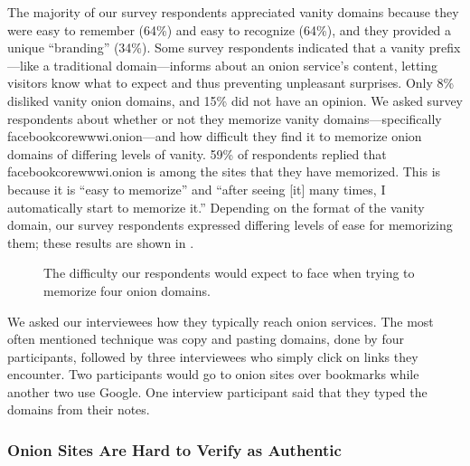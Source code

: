 The majority of our survey respondents appreciated vanity domains because they
were easy to remember (64\%) and easy to recognize (64\%), and they provided a
unique ``branding'' (34\%).  Some survey respondents indicated that a vanity
prefix---like a traditional domain---informs about an onion service's content,
letting visitors know what to expect and thus preventing unpleasant surprises.
Only 8\% disliked vanity onion domains, and 15\% did not have an opinion.  We
asked survey respondents about whether or not they memorize vanity
domains---specifically facebookcorewwwi.onion---and how difficult they find it
to memorize onion domains of differing levels of vanity.  59\% of respondents
replied that facebookcorewwwi.onion is among the sites that they have memorized.
This is 
because it is ``easy to memorize'' and ``after seeing [it] many times, I
automatically start to memorize it.'' Depending on the format of the vanity
domain, our survey respondents expressed differing levels of ease for memorizing
them; these results are shown in .

\begin{figure}[t]
    \centering
    
    \caption{The difficulty our respondents would expect to face when trying to
    memorize four onion domains.}
    \label{fig:memorize-domains}
\end{figure}

We asked our interviewees how they typically reach onion services.  The most
often mentioned technique was copy and pasting domains, done by four
participants, followed by three interviewees who simply click on links they
encounter.  Two participants would go to onion sites over bookmarks while
another two use Google.  One interview participant said that they typed the
domains from their notes.

\subsubsection{Onion Sites Are Hard to Verify as Authentic}

